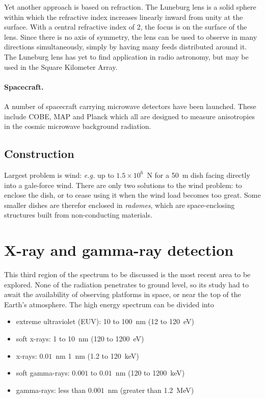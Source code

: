 Yet another approach is based on refraction. The Luneburg lens is a solid sphere 
within which the refractive index increases linearly inward from unity at the surface.
With a central refractive index of 2, the focus is on the surface of the lens. Since there
is no axis of symmetry, the lens can be used to observe in many directions simultaneously,
simply by having many feeds distributed around it. The Luneburg lens has yet to 
find application in radio astronomy, but may be used in the Square Kilometer Array.

\paragraph{Spacecraft.} A number of spacecraft carrying microwave detectors have been launched. 
These include COBE, MAP and Planck which all are designed to measure anisotropies in
 the cosmic microwave background radiation.

\subsection{Construction}

Largest problem is wind: {\it e.g.} up to $1.5\times 10^6$~N for a 50~m dish 
facing directly into a gale-force wind. There are only two solutions to the wind problem:
to enclose the dish, or to cease using it when the wind load becomes too great. Some 
smaller dishes are therefor enclosed in {\it radomes}, which are space-enclosing structures
built from non-conducting materials.

\section{X-ray and gamma-ray detection}

This third region of the spectrum to be discussed is the most recent area
to be explored. None of the radiation penetrates to ground level, so its
study had to await the availability of observing platforms in space, or near
the top of the Earth's atmosphere. The high energy spectrum can be divided into
\begin{itemize}
\item extreme ultraviolet (EUV): 10 to 100~nm (12 to 120~eV)
\item soft x-rays: 1 to 10~nm (120 to 1200~eV)
\item x-rays: $0.01$~nm 1~nm (1.2 to 120~keV)
\item soft gamma-rays: $0.001$ to $0.01$~nm (120 to 1200~keV)
\item gamma-rays: less than $0.001$~nm (greater than 1.2~MeV)
\end{itemize}

